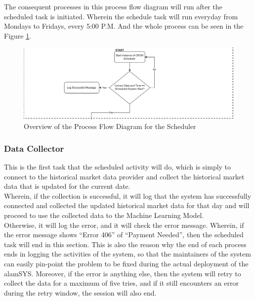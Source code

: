 The consequent processes in this process flow diagram will run after the 
scheduled task is initiated. Wherein the schedule task will run everyday from 
Mondays to Fridays, every 5:00 P.M. And the whole process can be seen in the 
Figure \ref{fig:process_flowchart_scheduler}.
\begin{figure}[ht]
    \centering
    \includegraphics[width=1\textwidth]{./assets/ProcessFlowchart-01.png}
    \caption{Overview of the Process Flow Diagram for the Scheduler}
    \label{fig:process_flowchart_scheduler}
\end{figure}
\FloatBarrier

\subsubsection{Data Collector}
\label{subsubsec:data_ollector}
This is the first task that the scheduled 
activity will do, which is simply to connect to the historical market 
data provider and collect the historical market data that is updated for 
the current date.
\hfill \\

Wherein, if the collection is successful, it will log that 
the system has successfully connected and collected the updated 
historical market data for that day and will proceed to use the 
collected data to the Machine Learning Model.
\hfill \\

Otherwise, it will log the error, and it will check the error message. 
Wherein, if the error message shows “Error 406” of “Payment Needed”, 
then the scheduled task will end in this section. This is also the reason why 
the end of each process ends in logging the activities of the system, so that 
the maintainers of the system can easily pin-point the problem to be fixed during 
the actual deployment of the alamSYS. Moreover, if the error is anything else, 
then the system will retry to collect the data for a maximum of five tries, and 
if it still encounters an error during the retry window, the session will also end.
\hfill \\

